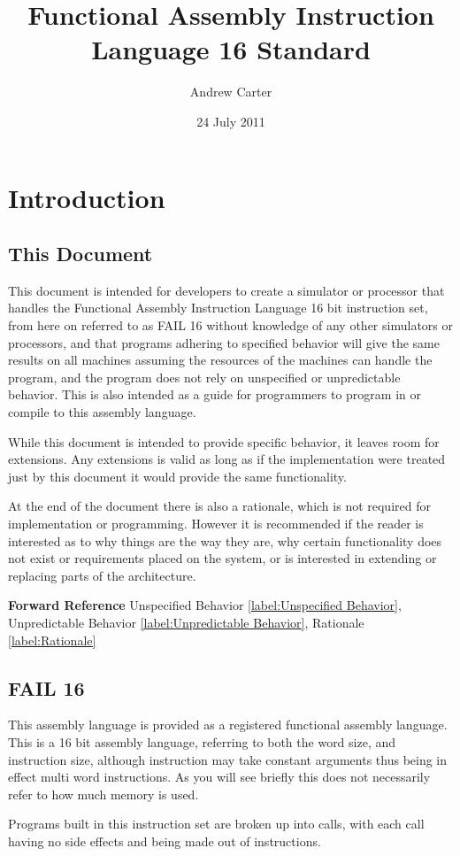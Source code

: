 \documentclass[12pt,letterpaper]{report}
\author{Andrew Carter}
\date{24 July 2011}
\title{Functional Assembly Instruction Language 16 Standard}
\newcommand{\SEE}{\textbf{Forward Reference} }
\newcommand{\fref}[2]{#2 \ref{#1:#2}}
\begin{document}
\maketitle
\tableofcontents
\chapter{Introduction}
\section{This Document}
This document is intended for developers to create a simulator or processor that handles the Functional Assembly Instruction Language 16 bit instruction set, from here on referred to as FAIL 16 without knowledge of any other simulators or processors, and that programs adhering to specified behavior will give the same results on all machines assuming the resources of the machines can handle the program, and the program does not rely on unspecified or unpredictable behavior. This is also intended as a guide for programmers to program in or compile to this assembly language.

While this document is intended to provide specific behavior, it leaves room for extensions. Any extensions is valid as long as if the implementation were treated just by this document it would provide the same functionality.

At the end of the document there is also a rationale, which is not required for implementation or programming. However it is recommended if the reader is interested as to why things are the way they are, why certain functionality does not exist or requirements placed on the system, or is interested in extending or replacing parts of the architecture.

\SEE \fref{label}{Unspecified Behavior}, \fref{label}{Unpredictable Behavior}, \fref{label}{Rationale}
\section{FAIL 16}
This assembly language is provided as a registered functional assembly language. This is a 16 bit assembly language, referring to both the word size, and instruction size, although instruction may take constant arguments thus being in effect multi word instructions. As you will see briefly this does not necessarily refer to how much memory is used.

Programs built in this instruction set are broken up into calls, with each call having no side effects and being made out of instructions.
\end{document}
